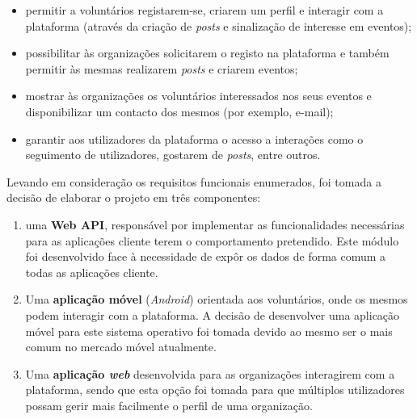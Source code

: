 \begin{itemize}
	\item permitir a voluntários registarem-se, criarem um perfil e interagir com a plataforma (através da criação de \textit{posts} e sinalização de interesse em eventos);
	\item possibilitar às organizações solicitarem o registo na plataforma e também permitir às mesmas realizarem \textit{posts} e criarem eventos;
	\item mostrar às organizações os voluntários interessados nos seus eventos e disponibilizar um contacto dos mesmos (por exemplo, e-mail);
	\item garantir aos utilizadores da plataforma o acesso a interações como o seguimento de utilizadores, gostarem de \textit{posts}, entre outros.
\end{itemize}

Levando em consideração os requisitos funcionais enumerados, foi tomada a decisão de elaborar o projeto em três componentes: 
\begin{enumerate}
	\item uma \textbf{Web API}, responsável por implementar as funcionalidades necessárias para as aplicações cliente terem o comportamento pretendido. Este módulo foi desenvolvido face à necessidade de expôr os dados de forma comum a todas as aplicações cliente.
	\item Uma \textbf{aplicação móvel} (\textit{Android}) orientada aos voluntários, onde os mesmos podem interagir com a plataforma.	A decisão de desenvolver uma aplicação móvel para este sistema operativo foi tomada devido ao mesmo ser o mais comum no mercado móvel atualmente.
	\item Uma \textbf{aplicação \textit{web}} desenvolvida para as organizações interagirem com a plataforma, sendo que esta opção foi tomada para que múltiplos utilizadores possam gerir mais facilmente o perfil de uma organização.
\end{enumerate}